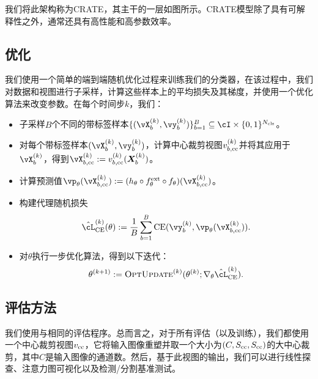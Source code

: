 \documentclass[../../book-main.tex]{subfiles}
\begin{document}
我们将此架构称为CRATE，其主干的一层如图所示。CRATE模型除了具有可解释性之外，通常还具有高性能和高参数效率。

\subsection{优化} \label{sub:image_classification_optimization}

我们使用一个简单的端到端随机优化过程来训练我们的分类器，在该过程中，我们对数据和视图进行子采样，计算这些样本上的平均损失及其梯度，并使用一个优化算法来改变参数。在每个时间步\(k\)，我们：
\begin{itemize}
    \item 子采样\(B\)个不同的带标签样本\(\{(\vX_{b}^{(k)}, \vy_{b}^{(k)})\}_{b = 1}^{B} \subseteq \cI \times \{0, 1\}^{N_{\cls}}\)。
    \item 对每个带标签样本\((\vX_{b}^{(k)}, \vy_{b}^{(k)})\)，计算中心裁剪视图\(v_{b, \mathrm{cc}}^{(k)}\)并将其应用于\(\vX_{b}^{(k)}\)，得到\(\vX_{b, \cc}^{(k)} := v_{b, \cc}^{(k)}(\X_{b}^{(k)})\)。
    \item 计算预测值\(\vp_{\theta}(\vX_{b, \cc}^{(k)}) := (h_{\theta} \circ f_{\theta}^{\ext} \circ f_{\theta})(\vX_{b, \cc}^{(k)})\)。
    \item 构建代理随机损失
    \begin{equation}
        \hat{\cL}_{\CE}^{(k)}(\theta) := \frac{1}{B}\sum_{b = 1}^{B}\CE(\vy_{b}^{(k)}, \vp_{\theta}(\vX_{b, \cc}^{(k)})).
    \end{equation}
    \item 对\(\theta\)执行一步优化算法，得到以下迭代：
    \begin{equation}
        \theta^{(k + 1)} := \textsc{OptUpdate}^{(k)}(\theta^{(k)}; \nabla_{\theta}\hat{\cL}_{\CE}^{(k)}).
    \end{equation}
\end{itemize}


\subsection{评估方法} \label{sub:image_classification_evals}

我们使用与相同的评估程序。总而言之，对于所有评估（以及训练），我们都使用一个中心裁剪视图\(v_{\mathrm{cc}}\)，它将输入图像重塑并取一个大小为\((C, S_{\mathrm{cc}}, S_{\mathrm{cc}})\)的大中心裁剪，其中\(C\)是输入图像的通道数。然后，基于此视图的输出，我们可以进行线性探查、注意力图可视化以及检测/分割基准测试。
\end{document}
